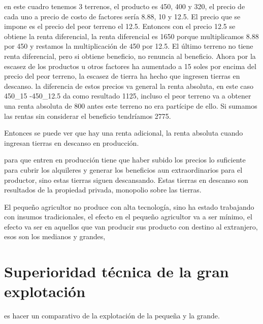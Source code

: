 \documentclass[
  a4paper,
]{article}
\begin{document}
en este cuadro tenemos 3 terrenos, el producto es 450, 400 y 320, el
precio de cada uno a precio de costo de factores sería 8.88, 10 y 12.5.
El precio que se impone es el precio del peor terreno el 12.5. Entonces
con el precio 12.5 se obtiene la renta diferencial, la renta diferencial
es 1650 porque multiplicamos 8.88 por 450 y restamos la multiplicación
de 450 por 12.5. El último terreno no tiene renta diferencial, pero si
obtiene beneficio, no renuncia al beneficio. Ahora por la escasez de los
productos u otros factores ha aumentado a 15 soles por encima del precio
del peor terreno, la escasez de tierra ha hecho que ingresen tierras en
descanso. la diferencia de estos precios va general la renta absoluta,
en este caso 450\_15 -450\_12.5 da como resultado 1125, incluso el peor
terreno va a obtener una renta absoluta de 800 antes este terreno no era
partícipe de ello. Si sumamos las rentas sin considerar el beneficio
tendríamos 2775.

Entonces se puede ver que hay una renta adicional, la renta absoluta
cuando ingresan tierras en descanso en producción.

para que entren en producción tiene que haber subido los precios lo
suficiente para cubrir los alquileres y generar los beneficios aun
extraordinarios para el productor, sino estas tierras siguen
descansando. Estas tierras en descanso son resultados de la propiedad
privada, monopolio sobre las tierras.

El pequeño agricultor no produce con alta tecnología, sino ha estado
trabajando con insumos tradicionales, el efecto en el pequeño agricultor
va a ser mínimo, el efecto va ser en aquellos que van producir sus
producto con destino al extranjero, esos son los medianos y grandes,

\hypertarget{superioridad-tuxe9cnica-de-la-gran-explotaciuxf3n-1}{%
\section{Superioridad técnica de la gran
explotación}\label{superioridad-tuxe9cnica-de-la-gran-explotaciuxf3n-1}}

es hacer un comparativo de la explotación de la pequeña y la grande.
\end{document}
